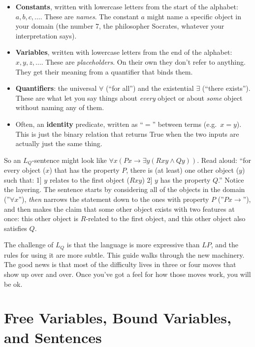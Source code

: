 \documentclass[11pt]{article}
\begin{document}
\begin{itemize}[leftmargin=*]
    In general, I think of predicates as \textit{partial questions}. The only thing preventing a predicate from becoming a \textit{full question} is that you have not specified who or what the \textit{partial question} is asking about. 
    \item \textbf{Constants}, written with lowercase letters from the start of the alphabet: $a, b, c, \dots$. These are \emph{names}. The constant $a$ might name a specific object in your domain (the number 7, the philosopher Socrates, whatever your interpretation says).
    \item \textbf{Variables}, written with lowercase letters from the end of the alphabet: $x, y, z, \dots$. These are \emph{placeholders}. On their own they don't refer to anything. They get their meaning from a quantifier that binds them.
    \item \textbf{Quantifiers}: the universal $\forall$ (``for all'') and the existential $\exists$ (``there exists''). These are what let you say things about \emph{every} object or about \emph{some} object without naming any of them.
    \item Often, an \textbf{identity} predicate, written as ``$=$'' between terms (e.g.~$x = y$). This is just the binary relation that returns True when the two inputs are actually just the same thing.
\end{itemize}

So an $L_Q$-sentence might look like $\forall x(Px \to \exists y(Rxy \wedge Qy))$. Read aloud: ``for every object ($x$) that has the property $P$, there is (at least) one other object ($y$) such that:
    1] $y$ relates to the first object ($Rxy$)
    2] $y$ has the property $Q$.''
Notice the layering. The sentence starts by considering all of the objects in the domain (''$\forall x$''), \textit{then} narrows the statement down to the ones with property $P$ (''$Px \to$''), and then makes the claim that some other object exists with two features at once: this other object is $R$-related to the first object, and this other object also satisfies $Q$.

The challenge of $L_Q$ is that the language is more expressive than $LP$, and the rules for using it are more subtle. This guide walks through the new machinery. The good news is that most of the difficulty lives in three or four moves that show up over and over. Once you've got a feel for how those moves work, you will be ok.

\section{Free Variables, Bound Variables, and Sentences}
\end{document}
